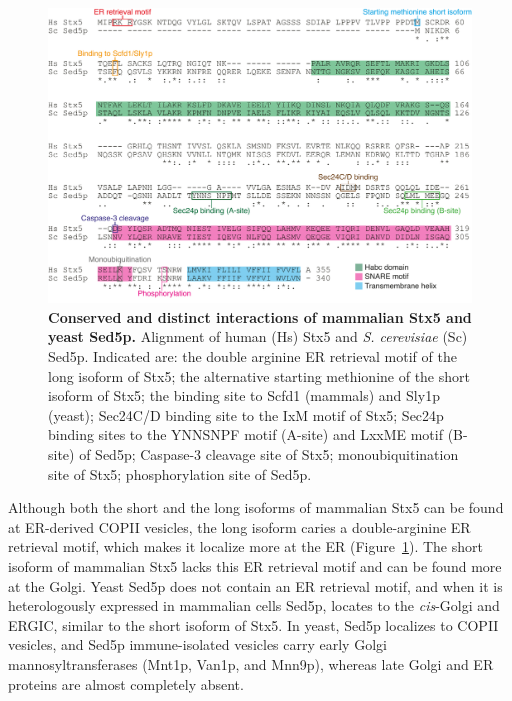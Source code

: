 \begin{figure}
    \includegraphics[keepaspectratio=true,width=\textwidth,height=\textheight]{chapters/chapter5/chapter5_Figure3}
    \caption{\textbf{Conserved and distinct interactions of mammalian Stx5 and yeast Sed5p.} Alignment of human (Hs) Stx5 and \emph{S. cerevisiae} (Sc) Sed5p. Indicated are: the double arginine ER retrieval motif of the long isoform of Stx5\cite{hui_isoform_1997,suga_syntaxin_2009}; the alternative starting methionine of the short isoform of Stx5\cite{hui_isoform_1997}; the binding site to Scfd1 (mammals) and Sly1p (yeast)\cite{arac_three-dimensional_2005,bracher_structural_2002}; Sec24C/D binding site to the IxM motif of Stx5\cite{adolf_sec24c/d-isoformspecific_2016,mancias_structural_2008}; Sec24p binding sites to the YNNSNPF motif (A-site) and LxxME motif (B-site) of Sed5p\cite{geng_syntaxin_2008}; Caspase-3 cleavage site of Stx5\cite{lowe_caspase-mediated_2004}; monoubiquitination site of Stx5\cite{huang_monoubiquitination_2016}; phosphorylation site of Sed5p\cite{weinberger_control_2005}.}
    \label{fig:ch5fig3}
\end{figure}

Although both the short and the long isoforms of mammalian Stx5 can be found at ER-derived COPII vesicles\cite{rowe_role_1998}, the long isoform caries a double-arginine ER retrieval motif, which makes it localize more at the ER (Figure~\ref{fig:ch5fig3})\cite{hui_isoform_1997,suga_syntaxin_2009,dominguez_gp25l/emp24/p24_1998}. The short isoform of mammalian Stx5 lacks this ER retrieval motif and can be found more at the Golgi\cite{hui_isoform_1997,suga_syntaxin_2009,dominguez_gp25l/emp24/p24_1998}. Yeast Sed5p does not contain an ER retrieval motif, and when it is heterologously expressed in mammalian cells Sed5p, locates to the \emph{cis}-Golgi and ERGIC, similar to the short isoform of Stx5\cite{banfield_localization_1994}. In yeast, Sed5p localizes to COPII vesicles, and Sed5p immune-isolated vesicles carry early Golgi mannosyltransferases (Mnt1p, Van1p, and Mnn9p), whereas late Golgi and ER proteins are almost completely absent\cite{cho_proteins_2000}.

